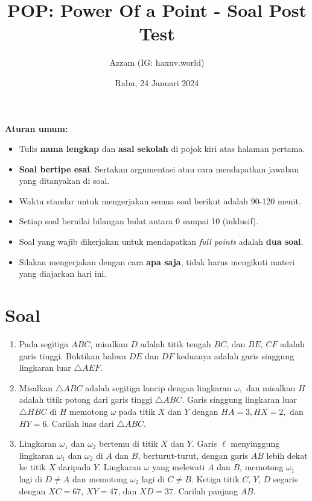\documentclass[12pt]{scrartcl}
\title{POP: Power Of a Point - Soal Post Test}
\author{Azzam (IG: haxuv.world)}
\date{Rabu, 24 Januari 2024}
\begin{document}
\maketitle

\renewcommand*\contentsname{Daftar Isi}
\tableofcontents

\newpage
\textbf{Aturan umum:}
\begin{itemize}
    \item Tulis \textbf{nama lengkap} dan \textbf{asal sekolah} di pojok kiri atas halaman pertama.
    \item \textbf{Soal bertipe esai}. Sertakan argumentasi atau cara mendapatkan jawaban yang ditanyakan di soal.
    \item Waktu standar untuk mengerjakan semua soal berikut adalah 90-120 menit.
    \item Setiap soal bernilai bilangan bulat antara 0 sampai 10 (inklusif).
    \item Soal yang wajib dikerjakan untuk mendapatkan \textit{full points} adalah \textbf{dua soal}.
    \item Silakan mengerjakan dengan cara \textbf{apa saja}, tidak harus mengikuti materi yang diajarkan hari ini.
\end{itemize}


\section{Soal}
\begin{enumerate}
    \item Pada segitiga $ABC$, misalkan $D$ adalah titik tengah $BC$, dan $BE$, $CF$ adalah garis tinggi. Buktikan bahwa $DE$ dan $DF$ keduanya adalah garis singgung lingkaran luar $\triangle AEF$. %

    \item Misalkan $\triangle ABC$ adalah segitiga lancip dengan lingkaran $\omega,$ dan misalkan $H$ adalah titik potong dari garis tinggi $\triangle ABC.$ Garis singgung lingkaran luar $\triangle HBC$ di $H$ memotong $\omega$ pada titik $X$ dan $Y$ dengan $HA=3,HX=2,$ dan $HY=6.$ Carilah luas dari $\triangle ABC$.

    \item Lingkaran $\omega_1$ dan $\omega_2$ bertemu di titik $X$ dan $Y$. Garis $\ell$ menyinggung lingkaran $\omega_1$ dan $\omega_2$ di $A$ dan $B$, berturut-turut, dengan garis $AB$ lebih dekat ke titik $X$ daripada $Y$. Lingkaran $\omega$ yang melewati $A$ dan $B$, memotong $\omega_1$ lagi di $D \neq A$ dan memotong $\omega_2$ lagi di $C \neq B$. Ketiga titik $C$, $Y$, $D$ segaris dengan $XC = 67$, $XY = 47$, dan $XD = 37$. Carilah panjang $AB$.
    
\end{enumerate}
\end{document}
